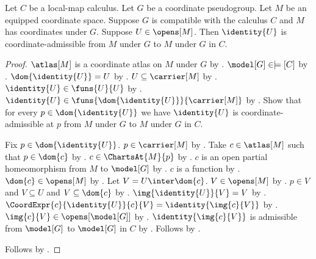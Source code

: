 \begin{theorem}\label{coordinate_admissible_identity}
    Let $C$ be a local-map calculus.
    Let $G$ be a coordinate pseudogroup.
    Let $M$ be an equipped coordinate space.
    Suppose $G$ is compatible with the calculus $C$ and $M$ has coordinates under $G$.
    Suppose $U\in\opens[M]$.
    Then $\identity{U}$ is coordinate-admissible from $M$ under $G$ to $M$ under $G$ in $C$.
\end{theorem}
\begin{proof}
    $\atlas[M]$ is a coordinate atlas on $M$ under $G$ by .
    $\model[G]\in\models[C]$ by .
    $\dom{\identity{U}}=U$ by .
    $U\subseteq\carrier[M]$ by .
    $\identity{U}\in\funs{U}{U}$ by .
    $\identity{U}\in\funs{\dom{\identity{U}}}{\carrier[M]}$ by .
    Show that for every $p\in\dom{\identity{U}}$ we have
        $\identity{U}$ is coordinate-admissible at $p$ from $M$ under $G$ to $M$ under $G$ in $C$.
    \begin{subproof}
        Fix $p\in\dom{\identity{U}}$.
        $p\in\carrier[M]$ by .
        Take $c\in\atlas[M]$ such that $p\in\dom{c}$ by .
        $c\in\ChartsAt{M}{p}$ by .
        $c$ is an open partial homeomorphism from $M$ to $\model[G]$ by .
        $c$ is a function by .
        $\dom{c}\in\opens[M]$ by .
        Let $V=U\inter\dom{c}$.
        $V\in\opens[M]$ by .
        $p\in V$ and $V\subseteq U$ and $V\subseteq\dom{c}$ by
            .
        $\img{\identity{U}}{V}=V$ by .
        $\CoordExpr{c}{\identity{U}}{c}{V}=\identity{\img{c}{V}}$ by
            .
        $\img{c}{V}\in\opens[\model[G]]$ by .
        $\identity{\img{c}{V}}$ is admissible from $\model[G]$ to $\model[G]$ in $C$ by
            .
        Follows by .
    \end{subproof}
    Follows by .
\end{proof}

